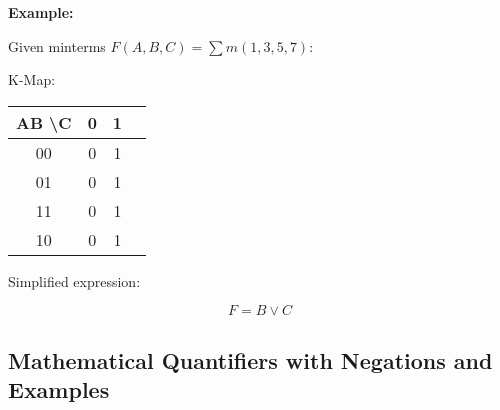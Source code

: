 \textbf{Example:}

Given minterms $F(A, B, C) = \sum m(1, 3, 5, 7)$:

\begin{multicols}{2}
K-Map:

\begin{center}
\begin{tabular}{|c|c|c|c|}
\hline
AB \textbackslash C & 0 & 1 \\
\hline
00 & 0 & 1 \\
01 & 0 & 1 \\
11 & 0 & 1 \\
10 & 0 & 1 \\
\hline
\end{tabular}
\end{center}

\columnbreak

Simplified expression:

\[
F = B \lor C
\]
\end{multicols}

\subsection{Mathematical Quantifiers with Negations and Examples}

